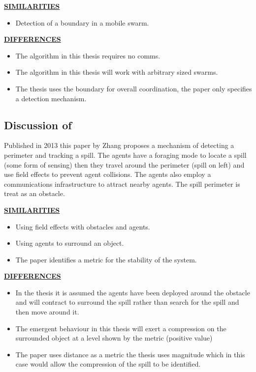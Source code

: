 \documentclass[a4paper,11pt,nocenter,bold,notitlepage,noheadline,noindent]{
thesis}
\begin{document}
\textbf{\underline{SIMILARITIES}}
\begin{itemize}
   \setlength\itemsep{0em}
	\item Detection of a boundary in a mobile swarm.
\end{itemize} 

\textbf{\underline{DIFFERENCES}}
\begin{itemize}
   \setlength\itemsep{0em}
	\item The algorithm in this thesis requires no comms.
	\item The algorithm in this thesis will work with arbitrary sized swarms.
	\item The thesis uses the boundary for overall coordination, the paper only specifies a detection mechanism.
\end{itemize} 

\subsection{Discussion of \cite{ZFG:13}}
Published in 2013 this paper by Zhang proposes a mechanism of detecting a perimeter and tracking a spill. The agents have a foraging mode to locate a spill (some form of sensing) then they travel around the perimeter (spill on left) and use field effects to prevent agent collisions. The agents also employ a communications infrastructure to attract nearby agents. The spill perimeter is treat as an obstacle.

\textbf{\underline{SIMILARITIES}}
\begin{itemize}
   \setlength\itemsep{0em}
	\item Using field effects with obstacles and agents.
	\item Using agents to surround an object. 
	\item The paper identifies a metric for the stability of the system. 
\end{itemize} 

\textbf{\underline{DIFFERENCES}}
\begin{itemize}
   \setlength\itemsep{0em}
	\item In the thesis it is assumed the agents have been deployed around the obstacle and will contract to surround the spill rather than search for the spill and then move around it.
	\item The emergent behaviour in this thesis will exert a compression on the surrounded object at a level shown by the metric (positive value)
	\item The paper uses distance as a metric the thesis uses magnitude which in this case would allow the compression of the spill to be identified. 
\end{itemize} 
\end{document}
